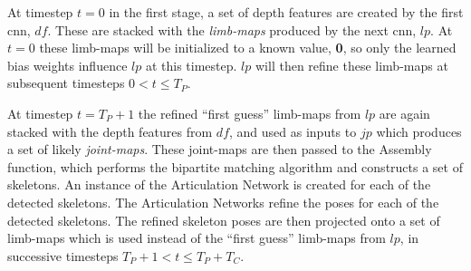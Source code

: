 At timestep $t = 0$ in the first stage, a set of depth features are created by the first \gls{cnn}, $df$. These are stacked with the \emph{limb-maps} produced by the next \gls{cnn}, $lp$. At $t = 0$ these limb-maps will be initialized to a known value, \textbf{0}, so only the learned bias weights influence $lp$ at this timestep. $lp$ will then refine these limb-maps at subsequent timesteps $0 < t \leq T_{P}$.

At timestep $t = T_{P} + 1$ the refined ``first guess'' limb-maps from $lp$ are again stacked with the depth features from $df$, and used as inputs to $jp$ which produces a set of likely \emph{joint-maps}. These joint-maps are then passed to the Assembly function, which performs the bipartite matching algorithm and constructs a set of skeletons. An instance of the Articulation Network is created for each of the detected skeletons. The Articulation Networks refine the poses for each of the detected skeletons. The refined skeleton poses are then projected onto a set of limb-maps which is used instead of the ``first guess'' limb-maps from $lp$, in successive timesteps $T_{P} + 1 < t \leq T_{P} + T_{C}$.




